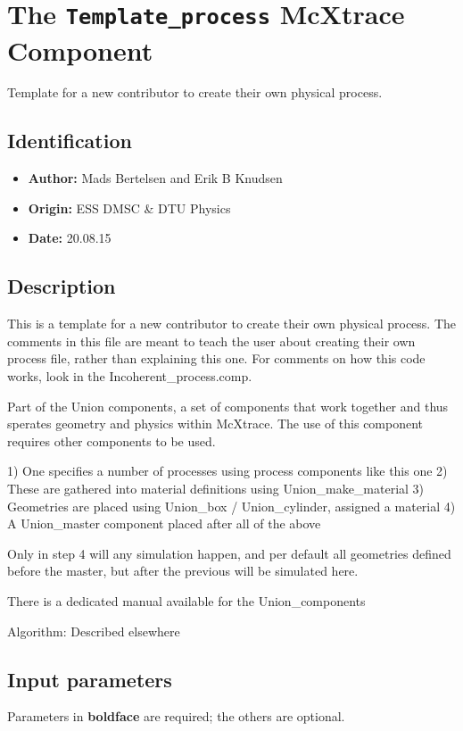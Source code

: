 \section{The \texttt{Template\_process} McXtrace Component}
Template for a new contributor to create their own physical process.

\subsection*{Identification}
\begin{itemize}
  \item \textbf{Author:} Mads Bertelsen and Erik B Knudsen
  \item \textbf{Origin:} ESS DMSC \& DTU Physics
  \item \textbf{Date:} 20.08.15
\end{itemize}

\subsection*{Description}
This is a template for a new contributor to create their own physical process. The comments in this file are meant to teach the user about creating their own process file, rather than explaining this one. For comments on how this code works, look in the Incoherent\_process.comp.

Part of the Union components, a set of components that work together and thus sperates geometry and physics within McXtrace. The use of this component requires other components to be used.

1) One specifies a number of processes using process components like this one 2) These are gathered into material definitions using Union\_make\_material 3) Geometries are placed using Union\_box / Union\_cylinder, assigned a material 4) A Union\_master component placed after all of the above

Only in step 4 will any simulation happen, and per default all geometries defined before the master, but after the previous will be simulated here.

There is a dedicated manual available for the Union\_components

Algorithm: Described elsewhere

\subsection*{Input parameters}
Parameters in \textbf{boldface} are required; the others are optional.

